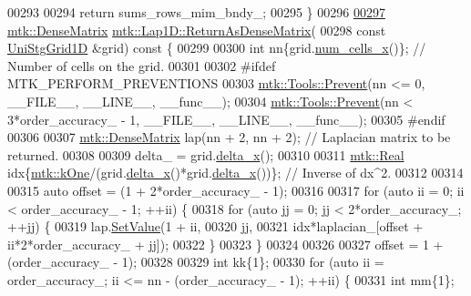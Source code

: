 \begin{DoxyCode}
00293 
00294   \textcolor{keywordflow}{return} sums\_rows\_mim\_bndy\_;
00295 \}
00296 
\hypertarget{mtk__lap__1d_8cc_source_l00297}{}\hyperlink{classmtk_1_1Lap1D_aaea34a17b0879e05eb4109645a2ba8f4}{00297} \hyperlink{classmtk_1_1DenseMatrix}{mtk::DenseMatrix} \hyperlink{classmtk_1_1Lap1D_aaea34a17b0879e05eb4109645a2ba8f4}{mtk::Lap1D::ReturnAsDenseMatrix}(
00298   \textcolor{keyword}{const} \hyperlink{classmtk_1_1UniStgGrid1D}{UniStgGrid1D} &grid)\textcolor{keyword}{ const }\{
00299 
00300   \textcolor{keywordtype}{int} nn\{grid.\hyperlink{classmtk_1_1UniStgGrid1D_af1b3729d8afa07be5b2775ed68015b80}{num\_cells\_x}()\};  \textcolor{comment}{// Number of cells on the grid.}
00301 
00302 \textcolor{preprocessor}{  #ifdef MTK\_PERFORM\_PREVENTIONS}
00303   \hyperlink{classmtk_1_1Tools_a332324c6f25e66be9dff48c5987a3b9f}{mtk::Tools::Prevent}(nn <= 0, \_\_FILE\_\_, \_\_LINE\_\_, \_\_func\_\_);
00304   \hyperlink{classmtk_1_1Tools_a332324c6f25e66be9dff48c5987a3b9f}{mtk::Tools::Prevent}(nn < 3*order\_accuracy\_ - 1, \_\_FILE\_\_, \_\_LINE\_\_, \_\_func\_\_);
00305 \textcolor{preprocessor}{  #endif}
00306 
00307   \hyperlink{classmtk_1_1DenseMatrix}{mtk::DenseMatrix} lap(nn + 2, nn + 2); \textcolor{comment}{// Laplacian matrix to be returned.}
00308 
00309   delta\_ = grid.\hyperlink{classmtk_1_1UniStgGrid1D_a6e7173b01241632cf509496d66b9f74c}{delta\_x}();
00310 
00311   \hyperlink{group__c01-roots_gac080bbbf5cbb5502c9f00405f894857d}{mtk::Real} idx\{\hyperlink{group__c01-roots_ga26407c24d43b6b95480943340d285c71}{mtk::kOne}/(grid.\hyperlink{classmtk_1_1UniStgGrid1D_a6e7173b01241632cf509496d66b9f74c}{delta\_x}()*grid.\hyperlink{classmtk_1_1UniStgGrid1D_a6e7173b01241632cf509496d66b9f74c}{delta\_x}())\}; \textcolor{comment}{// Inverse of
       dx^2.}
00312 
00314 
00315   \textcolor{keyword}{auto} offset = (1 + 2*order\_accuracy\_ - 1);
00316 
00317   \textcolor{keywordflow}{for} (\textcolor{keyword}{auto} ii = 0; ii < order\_accuracy\_ - 1; ++ii) \{
00318     \textcolor{keywordflow}{for} (\textcolor{keyword}{auto} jj = 0; jj < 2*order\_accuracy\_; ++jj) \{
00319       lap.\hyperlink{classmtk_1_1DenseMatrix_a784ce5784109ac86bfb9d8562b334b13}{SetValue}(1 + ii,
00320                    jj,
00321                    idx*laplacian\_[offset + ii*2*order\_accuracy\_ + jj]);
00322     \}
00323   \}
00324 
00326 
00327   offset = 1 + (order\_accuracy\_ - 1);
00328 
00329   \textcolor{keywordtype}{int} kk\{1\};
00330   \textcolor{keywordflow}{for} (\textcolor{keyword}{auto} ii = order\_accuracy\_; ii <= nn - (order\_accuracy\_ - 1); ++ii) \{
00331     \textcolor{keywordtype}{int} mm\{1\};

\end{DoxyCode}
